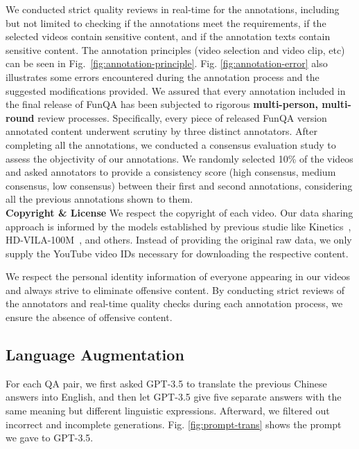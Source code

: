 We conducted strict quality reviews in real-time for the annotations, including but not limited to checking if the annotations meet the requirements, if the selected videos contain sensitive content, and if the annotation texts contain sensitive content. The annotation principles (video selection and video clip, etc) can be seen in Fig.~\ref{fig:annotation-principle}. Fig. \ref{fig:annotation-error} also illustrates some errors encountered during the annotation process and the suggested modifications provided. We assured that every annotation included in the final release of FunQA has been subjected to rigorous \textbf{multi-person, multi-round} review processes. Specifically, every piece of released FunQA version annotated content underwent scrutiny by three distinct annotators. After completing all the annotations, we conducted a consensus evaluation study to assess the objectivity of our annotations. We randomly selected 10\% of the videos and asked annotators to provide a consistency score (high consensus, medium consensus, low consensus) between their first and second annotations, considering all the previous annotations shown to them.\\
\noindent\textbf{Copyright \& License}\quad
We respect the copyright of each video. 
Our data sharing approach is informed by the models established by previous studie like Kinetics~\cite{kay2017kinetics}, HD-VILA-100M~\cite{xue2022hdvila}, and others. Instead of providing the original raw data, we only supply the YouTube video IDs necessary for downloading the respective content.

We respect the personal identity information of everyone appearing in our videos and always strive to eliminate offensive content. By conducting strict reviews of the annotators and real-time quality checks during each annotation process, we ensure the absence of offensive content.
\subsection{Language Augmentation} \label{appendix_a: Augmentation}
For each QA pair, we first asked GPT-3.5 to translate the previous Chinese answers into English, and then let GPT-3.5 give five separate answers with the same meaning but different linguistic expressions. Afterward, we filtered out incorrect and incomplete generations. Fig. \ref{fig:prompt-trans} shows the prompt we gave to GPT-3.5.

